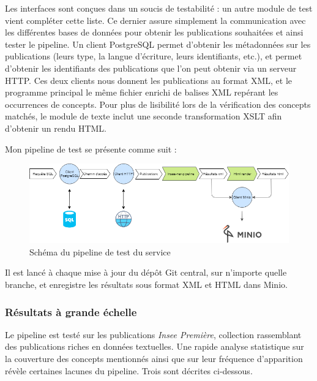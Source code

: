 Les interfaces sont conçues dans un soucis de testabilité : un autre module de test vient compléter cette liste. Ce dernier assure simplement la communication avec les différentes bases de données pour obtenir les publications souhaitées et ainsi tester le pipeline. Un client PostgreSQL permet d'obtenir les métadonnées sur les publications (leurs type, la langue d'écriture, leurs identifiants, etc.), et permet d'obtenir les identifiants des publications que l'on peut obtenir via un serveur HTTP. Ces deux clients nous donnent les publications au format XML, et le programme principal le même fichier enrichi de balises XML repérant les occurrences de concepts. Pour plus de lisibilité lors de la vérification des concepts matchés, le module de texte inclut une seconde transformation XSLT afin d'obtenir un rendu HTML.
\newline

Mon pipeline de test se présente comme suit :
\vspace{10pt}
\begin{figure}[H]
    \centering
    \includegraphics[scale=0.56]{images/Pipeline-test.png}
    \caption{Schéma du pipeline de test du service}
    \label{fig:pipeline-test}
\end{figure}
\vspace{10pt}

Il est lancé à chaque mise à jour du dépôt Git central, sur n'importe quelle branche, et enregistre les résultats sous format XML et HTML dans Minio.
\newline

\subsubsection*{Résultats à grande échelle}
Le pipeline est testé sur les publications \textit{Insee Première}, collection rassemblant des publications riches en données textuelles. Une rapide analyse statistique sur la couverture des concepts mentionnés ainsi que sur leur fréquence d'apparition révèle certaines lacunes du pipeline. Trois sont décrites ci-dessous.
\newline

